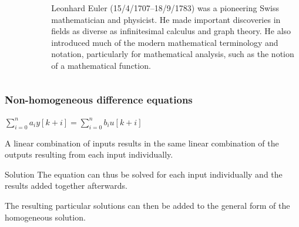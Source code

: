 \begin{frame}
	\begin{columns}
		\begin{column}{0.4\linewidth}
			\begin{figure}
			\centering
			\includegraphics[width=0.7\linewidth]{Images/Leonhard_Euler}

			\end{figure}
		\end{column}
		\begin{column}{0.6\linewidth}
			Leonhard Euler (15/4/1707–18/9/1783) was a pioneering Swiss mathematician and physicist. He made important discoveries in fields as diverse as infinitesimal calculus and graph theory. He also introduced much of the modern mathematical terminology and notation, particularly for mathematical analysis, such as the notion of a mathematical function.
		\end{column}
	\end{columns}
\end{frame}
\begin{frame}
	\frametitle{Non-homogeneous difference equations}
	\begin{definition}
		\begin{center}
			$\sum\limits_{i=0}^n a_iy[k+i] = \sum\limits_{i=0}^n b_iu[k+i]$\\
		\end{center}
	 	A linear combination of inputs results in the same linear combination of the outputs resulting from each input individually.
	\end{definition}
	\begin{block}{Solution}
		The equation can thus be solved for each input individually and the results added together afterwards.
			
		The resulting particular solutions can then be added to the general form of the homogeneous solution.
	\end{block}
\end{frame}
